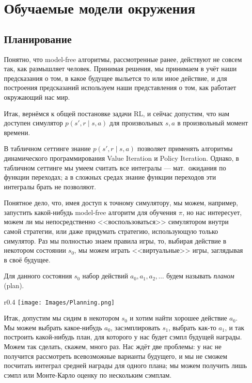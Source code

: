 \section{Обучаемые модели окружения}

\subsection{Планирование}

Понятно, что model-free алгоритмы, рассмотренные ранее, действуют не совсем так, как размышляет человек. Принимая решения, мы принимаем в учёт наши предсказания о том, в какое будущее выльется то или иное действие, и для построения предсказаний используем наши представления о том, как работает окружающий нас мир.

Итак, вернёмся к общей постановке задачи RL, и сейчас допустим, что нам доступен симулятор $p(s', r \mid s, a)$ для произвольных $s, a$ в произвольный момент времени.

В табличном сеттинге знание $p(s', r \mid s, a)$ позволяет применять алгоритмы динамического программирования Value Iteration и Policy Iteration. Однако, в табличном сеттинге мы умеем считать все интегралы --- мат.~ожидания по функции переходах; а в сложных средах знание функции переходов эти интегралы брать не позволяют.

Понятное дело, что, имея доступ к точному симулятору, мы можем, например, запустить какой-нибудь model-free алгоритм для обучения $\pi$, но нас интересует, можем ли мы непосредственно <<воспользоваться>> симулятором внутри самой стратегии, или даже придумать стратегию, использующую только симулятор. Раз мы полностью знаем правила игры, то, выбирая действие в некотором состоянии $s_0$, мы можем играть <<виртуальные>> игры, заглядывая в своё будущее. 

\begin{definition}
Для данного состояния $s_0$ набор действий $a_0, a_1, a_2, \dots$ будем называть \emph{планом} (plan).
\end{definition}

\begin{wrapfigure}{r}{0.4\textwidth}
\vspace{-0.5cm}
\centering
\texttt{[image: Images/Planning.png]}
\vspace{-0.5cm}
\end{wrapfigure}

Итак, допустим мы сидим в некотором $s_0$ и хотим найти хорошее действие $a_0$. Мы можем выбрать какое-нибудь $a_0$, засэмплировать $s_1$, выбрать как-то $a_1$, и так построить какой-нибудь план, для которого у нас будет сэмпл будущей награды. Можем так сделать, скажем, много раз. Нас ждёт две проблемы: у нас не получится рассмотреть всевозможные варианты будущего, и мы не сможем посчитать интеграл средней награды для одного плана; мы можем получить лишь сэмпл или Монте-Карло оценку по нескольким сэмплам.

